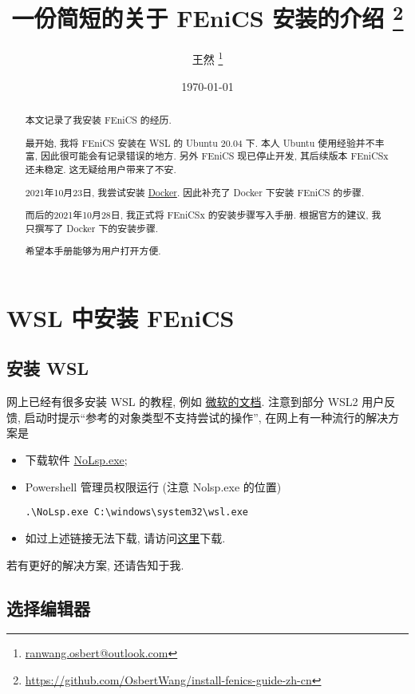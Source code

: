 \documentclass[fontset=founder]{ctexrep}
\title{\bfseries 一份简短的关于 FEniCS 安装的介绍%
  \thanks{\url{https://github.com/OsbertWang/install-fenics-guide-zh-cn}}%
}
\author{王然%
  \thanks{\href{mailto:ranwang.osbert@outlook.com}%
    {\ttfamily ranwang.osbert@outlook.com}}%
}
\date{\today}
\begin{document}
  
\maketitle

\begin{abstract}
  
  本文记录了我安装 FEniCS 的经历.
  
  最开始,
  我将 FEniCS 安装在 WSL 的 Ubuntu 20.04 下.
  本人 Ubuntu 使用经验并不丰富,
  因此很可能会有记录错误的地方.
  另外 FEniCS 现已停止开发,
  其后续版本 FEniCSx 还未稳定.
  这无疑给用户带来了不安.
  
  2021年10月23日,
  我尝试安装 \href{https://www.docker.com/get-started}{Docker}.
  因此补充了 Docker 下安装 FEniCS 的步骤.
  
  而后的2021年10月28日,
  我正式将 FEniCSx 的安装步骤写入手册.
  根据官方的建议,
  我只撰写了 Docker 下的安装步骤.
  
  希望本手册能够为用户打开方便.
\end{abstract}

\tableofcontents

\chapter{WSL 中安装 FEniCS}

\section{安装 WSL}\label{sec:wsl.install}

网上已经有很多安装 WSL 的教程,
例如%
\href{https://docs.microsoft.com/zh-cn/windows/wsl/install-win10}{微软的文档}.
注意到部分 WSL2 用户反馈,
启动时提示``参考的对象类型不支持尝试的操作'',
在网上有一种流行的解决方案是
\begin{itemize}
  \item 下载软件 \href{https://www.proxifier.com/tmp/Test20200228/NoLsp.exe}{NoLsp.exe};
  \item Powershell 管理员权限运行 (注意 Nolsp.exe 的位置)
  \begin{lstlisting}[gobble=4]
    .\NoLsp.exe C:\windows\system32\wsl.exe  
  \end{lstlisting}
  \item 如过上述链接无法下载,
  请访问\href{https://cowtransfer.com/s/626f2c73fc7a4f}{这里}下载.
\end{itemize}
若有更好的解决方案,
还请告知于我.

\section{选择编辑器}
\end{document}
